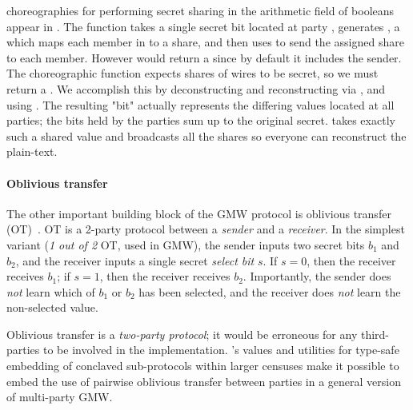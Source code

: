 \MultiChor choreographies for performing secret sharing in the arithmetic field of booleans appear in
. The function  takes a single secret bit located at party , generates ,
a  which maps each member in  to a share,
and then uses  to send the assigned share to each member.
However  would return a  since by default it includes the sender.
The choreographic function  expects shares of wires to be secret,
so we must return a .
We accomplish this by deconstructing and reconstructing via ,
and using .
The resulting  "bit" actually represents the differing values located at all parties;
the bits held by the parties sum up to the original secret.
 takes exactly such a shared value and broadcasts
all the shares so everyone can reconstruct the plain-text.

\paragraph{Oblivious transfer}
The other important building block of the GMW protocol is oblivious transfer (OT)~\cite{naor2001efficient}.
OT is a 2-party protocol between a \emph{sender} and a \emph{receiver}.
In the simplest variant (\emph{1 out of 2} OT, used in GMW), the sender inputs two secret bits $b_1$ and $b_2$,
and the receiver inputs a single secret \emph{select bit} $s$.
If $s=0$, then the receiver receives $b_1$; if $s=1$, then the receiver receives $b_2$.
Importantly, the sender does \emph{not} learn which of $b_1$ or $b_2$ has been selected,
and the receiver does \emph{not} learn the non-selected value.

Oblivious transfer is a \emph{two-party protocol}; it would be erroneous for any third-parties to be involved in the implementation.
\MultiChor's  values and utilities for type-safe embedding of conclaved sub-protocols within larger censuses
make it possible to embed the use of pairwise oblivious transfer between parties in a general version of multi-party GMW.

